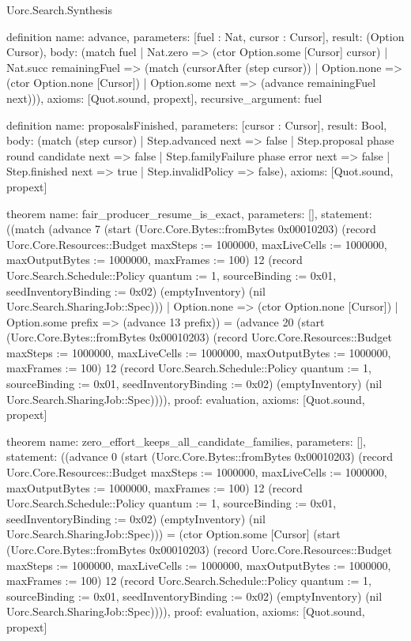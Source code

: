 \begin{lexlean}{Uorc.Search.Synthesis}
\begin{semanticmodule}
definition{
  name: advance,
  parameters: [fuel : Nat, cursor : Cursor],
  result: (Option Cursor),
  body: (match fuel
    | Nat.zero => (ctor Option.some [Cursor] cursor)
    | Nat.succ remainingFuel => (match (cursorAfter (step cursor))
      | Option.none => (ctor Option.none [Cursor])
      | Option.some next => (advance remainingFuel next))),
  axioms: [Quot.sound, propext],
  recursive_argument: fuel
}

definition{
  name: proposalsFinished,
  parameters: [cursor : Cursor],
  result: Bool,
  body: (match (step cursor)
    | Step.advanced next => false
    | Step.proposal phase round candidate next => false
    | Step.familyFailure phase error next => false
    | Step.finished next => true
    | Step.invalidPolicy => false),
  axioms: [Quot.sound, propext]
}

theorem{
  name: fair_producer_resume_is_exact,
  parameters: [],
  statement: ((match (advance 7 (start (Uorc.Core.Bytes::fromBytes 0x00010203) (record Uorc.Core.Resources::Budget {maxSteps := 1000000, maxLiveCells := 1000000, maxOutputBytes := 1000000, maxFrames := 100}) 12 (record Uorc.Search.Schedule::Policy {quantum := 1, sourceBinding := 0x01, seedInventoryBinding := 0x02}) (emptyInventory) (nil Uorc.Search.SharingJob::Spec)))
    | Option.none => (ctor Option.none [Cursor])
    | Option.some prefix => (advance 13 prefix)) = (advance 20 (start (Uorc.Core.Bytes::fromBytes 0x00010203) (record Uorc.Core.Resources::Budget {maxSteps := 1000000, maxLiveCells := 1000000, maxOutputBytes := 1000000, maxFrames := 100}) 12 (record Uorc.Search.Schedule::Policy {quantum := 1, sourceBinding := 0x01, seedInventoryBinding := 0x02}) (emptyInventory) (nil Uorc.Search.SharingJob::Spec)))),
  proof: evaluation{},
  axioms: [Quot.sound, propext]
}

theorem{
  name: zero_effort_keeps_all_candidate_families,
  parameters: [],
  statement: ((advance 0 (start (Uorc.Core.Bytes::fromBytes 0x00010203) (record Uorc.Core.Resources::Budget {maxSteps := 1000000, maxLiveCells := 1000000, maxOutputBytes := 1000000, maxFrames := 100}) 12 (record Uorc.Search.Schedule::Policy {quantum := 1, sourceBinding := 0x01, seedInventoryBinding := 0x02}) (emptyInventory) (nil Uorc.Search.SharingJob::Spec))) = (ctor Option.some [Cursor] (start (Uorc.Core.Bytes::fromBytes 0x00010203) (record Uorc.Core.Resources::Budget {maxSteps := 1000000, maxLiveCells := 1000000, maxOutputBytes := 1000000, maxFrames := 100}) 12 (record Uorc.Search.Schedule::Policy {quantum := 1, sourceBinding := 0x01, seedInventoryBinding := 0x02}) (emptyInventory) (nil Uorc.Search.SharingJob::Spec)))),
  proof: evaluation{},
  axioms: [Quot.sound, propext]
}


\end{semanticmodule}
\end{lexlean}
